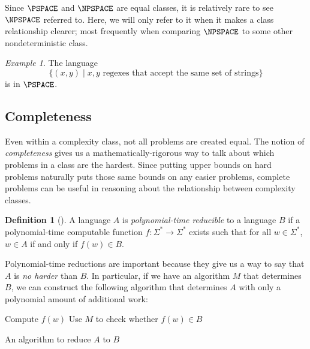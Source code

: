 \documentclass[english,12pt]{reedthesis}
\theoremstyle{plain}
\theoremstyle{definition}
\newtheorem{defn}[defn]{Definition}
\theoremstyle{remark}
\newtheorem{example}{Example}[thm]
\begin{document}
Since $\PSPACE$ and $\NPSPACE$ are equal classes, it is relatively rare to see
$\NPSPACE$ referred to. Here, we will only refer to it when it makes a class
relationship clearer; most frequently when comparing $\NPSPACE$ to some other
nondeterministic class.

\begin{example}\label{ex:regex-is-pspace}
  The language
  \[
    \{(x, y) \mid x, y \text{ regexes that accept the same set of strings}\}
  \]
  is in $\PSPACE$. %
\end{example}



\subsection{Completeness}

Even within a complexity class, not all problems are created equal. The notion
of \emph{completeness} gives us a mathematically-rigorous way to talk about
which problems in a class are the hardest. Since putting upper bounds on hard
problems naturally puts those same bounds on any easier problems, complete
problems can be useful in reasoning about the relationship between complexity
classes.

\begin{defn}[{\cite[Def.\ 7.29]{Sip97}}]\label{def:p-reduction}
  A language $A$ is \emph{polynomial-time reducible} to a language $B$ if a
  polynomial-time computable function $f: \Sigma^{*} \rightarrow \Sigma^{*}$ exists such that for
  all $w \in \Sigma^{*}$, $w \in A$ if and only if $f(w) \in B$.
\end{defn}

Polynomial-time reductions are important because they give us a way to say that
$A$ is \emph{no harder} than $B$. In particular, if we have an algorithm $M$
that determines $B$, we can construct the following algorithm that determines
$A$ with only a polynomial amount of additional work:

\begin{algorithm}[H]
  Compute $f(w)$\;
  Use $M$ to check whether $f(w) \in B$\;
  \;
  \caption{An algorithm to reduce $A$ to $B$}
\end{algorithm}
\end{document}
